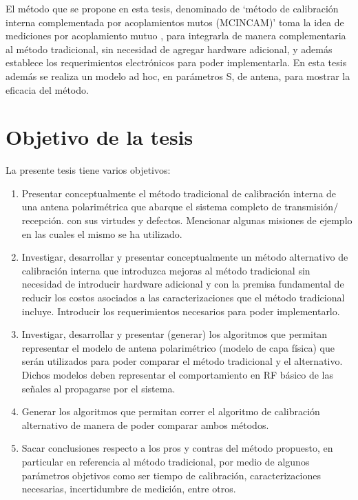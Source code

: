 \documentclass[a4paper,10pt]{article}
\begin{document}
El método que se propone en esta tesis, denominado de \enquote*{método de 
calibración interna complementada por acoplamientos mutos (MCINCAM)} toma la 
idea de mediciones por acoplamiento mutuo ,
para integrarla de manera complementaria al método tradicional, sin necesidad de
agregar hardware adicional, y además establece los requerimientos electrónicos
para poder implementarla. En esta tesis además se realiza un modelo ad hoc, en 
parámetros S, de antena, para mostrar la eficacia del método. 


\section{Objetivo de la tesis}

La presente tesis tiene varios objetivos:

\begin{enumerate}
    \item Presentar conceptualmente el método tradicional de calibración interna
de una antena polarimétrica que abarque el sistema completo de transmisión/
recepción. con sus virtudes y defectos. Mencionar algunas misiones de ejemplo en
las cuales el mismo se ha utilizado.
    \item Investigar, desarrollar y presentar conceptualmente un método 
alternativo de calibración interna que introduzca mejoras al método tradicional 
sin necesidad de introducir hardware adicional y con la premisa fundamental de 
reducir los costos asociados a las caracterizaciones que el método tradicional 
incluye. Introducir los requerimientos necesarios para poder implementarlo.
    \item Investigar, desarrollar y presentar (generar) los algoritmos que 
permitan representar el modelo de antena polarimétrico (modelo de capa física) 
que serán utilizados para poder comparar el método tradicional y el alternativo.
Dichos modelos deben representar el comportamiento en RF básico de las señales 
al propagarse por el sistema.
    \item Generar los algoritmos que permitan correr el algoritmo de calibración
alternativo de manera de poder comparar ambos métodos.
    \item Sacar conclusiones respecto a los pros y contras del método propuesto,
en particular en referencia al método tradicional, por medio de algunos 
parámetros objetivos como ser tiempo de calibración, caracterizaciones 
necesarias, incertidumbre de medición, entre otros.
\end{enumerate}    
\end{document}
